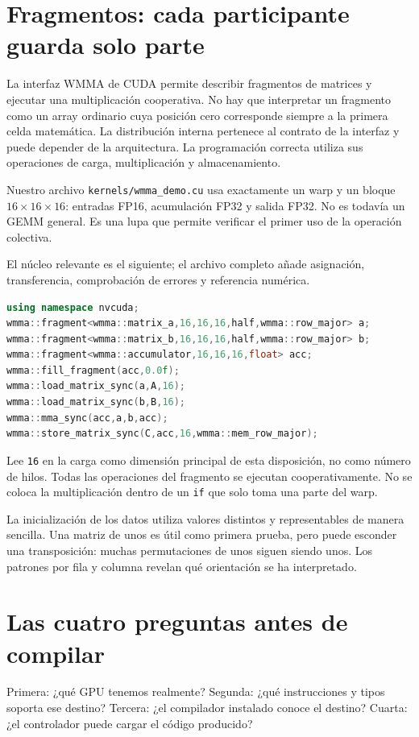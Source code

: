 \documentclass[12pt,a4paper,oneside]{report}
\begin{document}
\section{Fragmentos: cada participante guarda solo parte}
La interfaz WMMA de CUDA permite describir fragmentos de matrices y ejecutar una multiplicación cooperativa. No hay que interpretar un fragmento como un array ordinario cuya posición cero corresponde siempre a la primera celda matemática. La distribución interna pertenece al contrato de la interfaz y puede depender de la arquitectura. La programación correcta utiliza sus operaciones de carga, multiplicación y almacenamiento. \cite{cuda,ptx}

Nuestro archivo \texttt{kernels/wmma\_demo.cu} usa exactamente un warp y un bloque $16\times16\times16$: entradas FP16, acumulación FP32 y salida FP32. No es todavía un GEMM general. Es una lupa que permite verificar el primer uso de la operación colectiva.

El núcleo relevante es el siguiente; el archivo completo añade asignación, transferencia, comprobación de errores y referencia numérica.

\begin{lstlisting}[language=C++]
using namespace nvcuda;
wmma::fragment<wmma::matrix_a,16,16,16,half,wmma::row_major> a;
wmma::fragment<wmma::matrix_b,16,16,16,half,wmma::row_major> b;
wmma::fragment<wmma::accumulator,16,16,16,float> acc;
wmma::fill_fragment(acc,0.0f);
wmma::load_matrix_sync(a,A,16);
wmma::load_matrix_sync(b,B,16);
wmma::mma_sync(acc,a,b,acc);
wmma::store_matrix_sync(C,acc,16,wmma::mem_row_major);
\end{lstlisting}
Lee \texttt{16} en la carga como dimensión principal de esta disposición, no como número de hilos. Todas las operaciones del fragmento se ejecutan cooperativamente. No se coloca la multiplicación dentro de un \texttt{if} que solo toma una parte del warp.

La inicialización de los datos utiliza valores distintos y representables de manera sencilla. Una matriz de unos es útil como primera prueba, pero puede esconder una transposición: muchas permutaciones de unos siguen siendo unos. Los patrones por fila y columna revelan qué orientación se ha interpretado.

\section{Las cuatro preguntas antes de compilar}
Primera: ¿qué GPU tenemos realmente? Segunda: ¿qué instrucciones y tipos soporta ese destino? Tercera: ¿el compilador instalado conoce el destino? Cuarta: ¿el controlador puede cargar el código producido?
\end{document}
